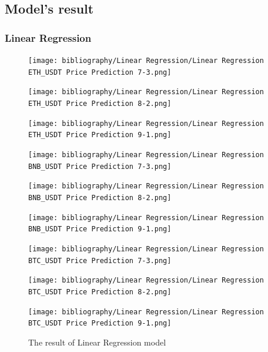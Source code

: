 \documentclass{ieeeojies}
\begin{document}
\subsection{Model's result}
\subsubsection{Linear Regression}
\begin{figure}[H]
    \centering
    \begin{minipage}{0.15\textwidth}
    \centering
    \texttt{[image: bibliography/Linear Regression/Linear Regression ETH\_USDT Price Prediction 7-3.png]}
    \end{minipage}
    \hfill
    \begin{minipage}{0.15\textwidth}
    \centering
    \texttt{[image: bibliography/Linear Regression/Linear Regression ETH\_USDT Price Prediction 8-2.png]}
    \end{minipage}
    \hfill
    \begin{minipage}{0.15\textwidth}
    \centering
    \texttt{[image: bibliography/Linear Regression/Linear Regression ETH\_USDT Price Prediction 9-1.png]}
    \end{minipage}
    \centering
    \begin{minipage}{0.15\textwidth}
    \centering
    \texttt{[image: bibliography/Linear Regression/Linear Regression BNB\_USDT Price Prediction 7-3.png]}
    \end{minipage}
    \hfill
    \begin{minipage}{0.15\textwidth}
    \centering
    \texttt{[image: bibliography/Linear Regression/Linear Regression BNB\_USDT Price Prediction 8-2.png]}
    \end{minipage}
    \hfill
    \begin{minipage}{0.15\textwidth}
    \centering
    \texttt{[image: bibliography/Linear Regression/Linear Regression BNB\_USDT Price Prediction 9-1.png]}
    \end{minipage}
    \centering
    \begin{minipage}{0.15\textwidth}
    \centering
    \texttt{[image: bibliography/Linear Regression/Linear Regression BTC\_USDT Price Prediction 7-3.png]}
    \end{minipage}
    \hfill
    \begin{minipage}{0.15\textwidth}
    \centering
    \texttt{[image: bibliography/Linear Regression/Linear Regression BTC\_USDT Price Prediction 8-2.png]}
    \end{minipage}
    \hfill
    \begin{minipage}{0.15\textwidth}
    \centering
    \texttt{[image: bibliography/Linear Regression/Linear Regression BTC\_USDT Price Prediction 9-1.png]}
    \end{minipage}
    \caption{The result of Linear Regression model}
    \label{fig:enter-label}
\end{figure}
\end{document}
